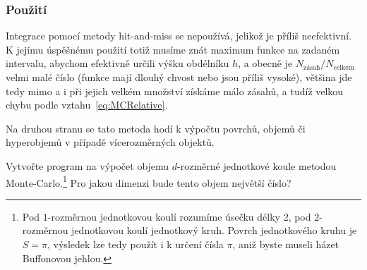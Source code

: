 \documentclass[a4paper,11pt,twoside]{article}
\theoremstyle{red}
\theoremstyle{green}
\begin{document}
        \subsubsection{Použití}
            Integrace pomocí metody hit-and-miss se nepoužívá, jelikož je příliš neefektivní. 
            K jejímu úspěšnému použití totiž musíme znát maximum funkce na zadaném intervalu, abychom efektivně určili výšku obdélníku $h$, a obecně je $N_{\text{zásah}}/N_{\text{celkem}}$ velmi malé číslo (funkce mají dlouhý chvost nebo jsou příliš vysoké), většina  jde tedy mimo a i při jejich velkém množství získáme málo zásahů, a tudíž velkou chybu podle vztahu~\eqref{eq:MCRelative}.

            Na druhou stranu se tato metoda hodí k výpočtu povrchů, objemů či hyperobjemů v případě vícerozměrných objektů.
            
            \begin{task}
                Vytvořte program na výpočet objemu $d$-rozměrné jednotkové koule metodou Monte-Car\-lo.\footnote{
                    Pod $1$-rozměrnou jednotkovou koulí rozumíme úsečku délky 2, pod $2$-rozměrnou jednotkovou koulí jednotkový kruh.
                    Povrch jednotkového kruhu je $S=\pi$, výsledek lze tedy použít i k určení čísla $\pi$, aniž byste museli házet Buffonovou jehlou.
                }
                Pro jakou dimenzi bude tento objem největší číslo?
            \end{task}
        
\end{document}
